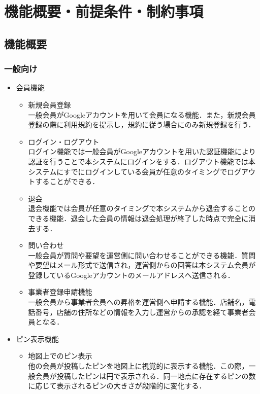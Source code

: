 \section{機能概要・前提条件・制約事項}
\subsection{機能概要}
\subsubsection{一般向け}
\begin{itemize}[itemsep=10pt]
    \item 会員機能
    \begin{itemize}[itemsep=10pt]
        \item 新規会員登録 \mbox{}\\
        一般会員がGoogleアカウントを用いて会員になる機能．また，新規会員登録の際に利用規約を提示し，規約に従う場合にのみ新規登録を行う．
        \item ログイン・ログアウト \mbox{}\\
        ログイン機能では一般会員がGoogleアカウントを用いた認証機能により認証を行うことで本システムにログインをする．ログアウト機能では本システムにすでにログインしている会員が任意のタイミングでログアウトすることができる．
        \item 退会 \mbox{}\\
        退会機能では会員が任意のタイミングで本システムから退会することのできる機能．退会した会員の情報は退会処理が終了した時点で完全に消去する．
        \item 問い合わせ \mbox{}\\
        一般会員が質問や要望を運営側に問い合わせることができる機能．質問や要望はメール形式で送信され，運営側からの回答は本システム会員が登録しているGoogleアカウントのメールアドレスへ送信される．
        \item 事業者登録申請機能 \mbox{}\\
        一般会員から事業者会員への昇格を運営側へ申請する機能．店舗名，電話番号，店舗の住所などの情報を入力し運営からの承認を経て事業者会員となる．
    \end{itemize}
    \item ピン表示機能
    \begin{itemize}[itemsep=10pt]
        \item 地図上でのピン表示 \mbox{}\\
        他の会員が投稿したピンを地図上に視覚的に表示する機能．この際，一般会員が投稿したピンは円で表示される．同一地点に存在するピンの数に応じて表示されるピンの大きさが段階的に変化する．

\end{itemize}
\end{itemize}
